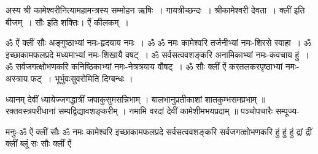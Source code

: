अस्य श्री कामेश्वरीनित्यामहामन्त्रस्य सम्मोहन ऋषिः~। गायत्रीच्छन्दः~। श्रीकामेश्वरी देवता~। क्लीं इति बीजम्~। सौः इति शक्तिः। ऐं कीलकम्~।

ॐ ऐं क्लीं सौः अङ्गुष्ठाभ्यां नमः-हृदयाय नमः~। 
ॐ ॐ नमः कामेश्वरि तर्जनीभ्यां नमः-शिरसे स्वाहा~।
ॐ इच्छाकामफलप्रदे मध्यमाभ्यां नमः-शिखायै वषट्~।
ॐ सर्वसत्ववशङ्करि अनामिकाभ्यां नमः-कवचाय हुं~।
ॐ सर्वजगत्क्षोभणकरि कनिष्ठिकाभ्यां नमः-नेत्रत्रयाय वौषट्~।
ॐ सौः क्लीं ऐं करतलकरपृष्ठाभ्यां नमः-अस्त्राय फट्~।
भूर्भुवःसुवरोमिति दिग्बन्धः ।

ध्यानम्
देवीं ध्यायेज्जगद्धात्रीं जपाकुसुमसन्निभाम् ।
बालभानुप्रतीकाशां शातकुम्भसमप्रभाम् ॥
रक्तवस्त्रपरीधानां सम्पद्विद्यावशङ्करीम् ।
नमामि वरदां देवीं कामेशीमभयप्रदाम् ॥
पञ्चोपचारैः सम्पूज्य-

मनुः-ॐ ऐं क्लीं सौः ॐ नमः कामेश्वरि इच्छाकामफलप्रदे सर्वसत्ववशङ्करि सर्वजगत्क्षोभणकरि हुं हुं हुं द्रां द्रीं क्लीं ब्लूं सः सौः क्लीं ऐं 



